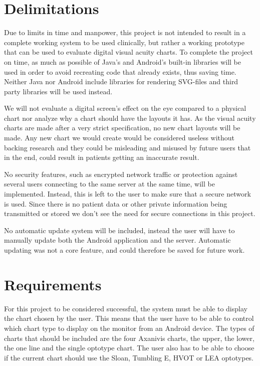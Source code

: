 \documentclass[12pt,a4paper,notitlepage]{report}
\begin{document}
\section{Delimitations}
Due to limits in time and manpower, this project is not intended to result in a complete working system to be used clinically, but rather a working prototype that can be used to evaluate digital visual acuity charts. To complete the project on time, as much as possible of Java's and Android's built-in libraries will be used in order to avoid recreating code that already exists, thus saving time. Neither Java nor Android include libraries for rendering SVG-files and third party libraries will be used instead.


We will not evaluate a digital screen's effect on the eye compared to a physical chart nor analyze why a chart should have the layouts it has. As the visual acuity charts are made after a very strict specification, no new chart layouts will be made. Any new chart we would create would be considered useless without backing research and they could be misleading and misused by future users that in the end, could result in patients getting an inaccurate result.

No security features, such as encrypted network traffic or protection against several users connecting to the same server at the same time, will be implemented. Instead, this is left to the user to make sure that a secure network is used. Since there is no patient data or other private information being transmitted or stored we don't see the need for secure connections in this project.

No automatic update system will be included, instead the user will have to manually update both the Android application and the server. Automatic updating was not a core feature, and could therefore be saved for future work.

\section{Requirements}
For this project to be considered successful, the system must be able to display the chart chosen by the user. This means that the user have to be able to control which chart type to display on the monitor from an Android device. The types of charts that should be included are the four Axanivis charts, the upper, the lower, the one line and the single optotype chart. The user also has to be able to choose if the current chart should use the Sloan, Tumbling E, HVOT or LEA optotypes.
\end{document}
